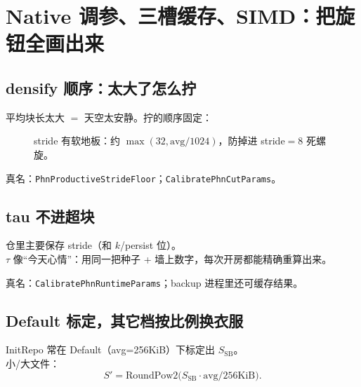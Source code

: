 \chapter{Native 调参、三槽缓存、SIMD：把旋钮全画出来}
\label{ch:native-calib}

\section{densify 顺序：太大了怎么拧}

平均块长太大 $=$ 天空太安静。拧的顺序固定：

\begin{figure}[htbp]
\centering
{}
\caption{stride 有软地板：约 $\max(32,\mathrm{avg}/1024)$，防掉进 stride$=$8 死螺旋。}
\label{fig:densify}
\end{figure}

真名：\texttt{PhnProductiveStrideFloor}；\texttt{CalibratePhnCutParams}。

\section{\texorpdfstring{tau 不进超块}{tau 不进超块}}

\begin{metaphor}[墙上只贴网格纸]
仓里主要保存 stride（和 $k$/persist 位）。\\
$\tau$ 像``今天心情''：用同一把种子 + 墙上数字，每次开房都能精确重算出来。
\end{metaphor}

真名：\texttt{CalibratePhnRuntimeParams}；backup 进程里还可缓存结果。

\section{Default 标定，其它档按比例换衣服}

InitRepo 常在 Default（avg=256KiB）下标定出 $S_{\mathrm{SB}}$。\\
小/大文件：
\begin{equation}
S'=\mathrm{RoundPow2}\big(S_{\mathrm{SB}}\cdot\mathrm{avg}/256\mathrm{KiB}\big).
\end{equation}

